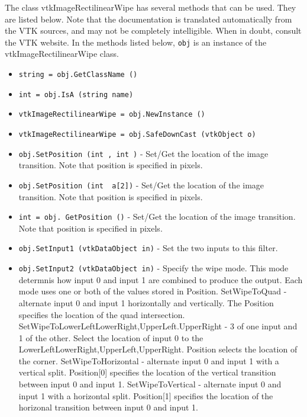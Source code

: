 The class vtkImageRectilinearWipe has several methods that can be used.
  They are listed below.
Note that the documentation is translated automatically from the VTK sources,
and may not be completely intelligible.  When in doubt, consult the VTK website.
In the methods listed below, \verb|obj| is an instance of the vtkImageRectilinearWipe class.
\begin{itemize}
\item  \verb|string = obj.GetClassName ()|

\item  \verb|int = obj.IsA (string name)|

\item  \verb|vtkImageRectilinearWipe = obj.NewInstance ()|

\item  \verb|vtkImageRectilinearWipe = obj.SafeDownCast (vtkObject o)|

\item  \verb|obj.SetPosition (int , int )| -  Set/Get the location of the image transition. Note that position is
 specified in pixels.

\item  \verb|obj.SetPosition (int  a[2])| -  Set/Get the location of the image transition. Note that position is
 specified in pixels.

\item  \verb|int = obj. GetPosition ()| -  Set/Get the location of the image transition. Note that position is
 specified in pixels.

\item  \verb|obj.SetInput1 (vtkDataObject in)| -  Set the two inputs to this filter.

\item  \verb|obj.SetInput2 (vtkDataObject in)| -  Specify the wipe mode. This mode determnis how input 0 and input
 1 are combined to produce the output. Each mode uses one or both
 of the values stored in Position.
   SetWipeToQuad - alternate input 0 and input 1 horizontally and
     vertically. The Position specifies the location of the quad
     intersection.
   SetWipeToLowerLeft{LowerRight,UpperLeft.UpperRight} - 3 of one
     input and 1 of the other. Select the location of input 0 to the
     LowerLeft{LowerRight,UpperLeft,UpperRight}. Position
     selects the location of the corner.
   SetWipeToHorizontal - alternate input 0 and input 1 with a vertical
     split. Position[0] specifies the location of the vertical
     transition between input 0 and input 1.
   SetWipeToVertical - alternate input 0 and input 1 with a
     horizontal split. Position[1] specifies the location of the
     horizonal transition between input 0 and input 1.


\end{itemize}

